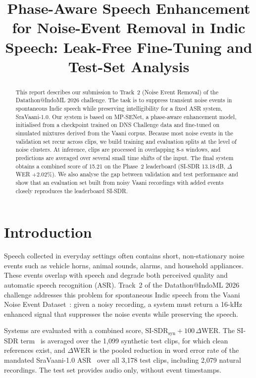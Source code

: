 \documentclass[conference]{IEEEtran}
\begin{document}
\title{Phase-Aware Speech Enhancement for Noise-Event Removal in Indic Speech: Leak-Free Fine-Tuning and Test-Set Analysis}
\author{
}
\maketitle

\begin{abstract}
This report describes our submission to Track~2 (Noise Event Removal) of the Datathon@IndoML 2026 challenge. The task is to suppress transient noise events in spontaneous Indic speech while preserving intelligibility for a fixed ASR system, SraVaani-1.0. Our system is based on MP-SENet, a phase-aware enhancement model, initialised from a checkpoint trained on DNS Challenge data and fine-tuned on simulated mixtures derived from the Vaani corpus. Because most noise events in the validation set recur across clips, we build training and evaluation splits at the level of noise clusters. At inference, clips are processed in overlapping 8-s windows, and predictions are averaged over several small time shifts of the input. The final system obtains a combined score of 15.21 on the Phase~2 leaderboard (SI-SDR 13.18\,dB, $\Delta$WER $+2.02$\%). We also analyse the gap between validation and test performance and show that an evaluation set built from noisy Vaani recordings with added events closely reproduces the leaderboard SI-SDR.
\end{abstract}

\section{Introduction}
Speech collected in everyday settings often contains short, non-stationary noise events such as vehicle horns, animal sounds, alarms, and household appliances. These events overlap with speech and degrade both perceived quality and automatic speech recognition (ASR). Track~2 of the Datathon@IndoML 2026 challenge addresses this problem for spontaneous Indic speech from the Vaani Noise Event Dataset~\cite{basu2026vaani}: given a noisy recording, a system must return a 16-kHz enhanced signal that suppresses the noise events while preserving the speech.

Systems are evaluated with a combined score, $\text{SI-SDR}_\text{syn} + 100\,\Delta\text{WER}$. The SI-SDR term~\cite{le2019sdr} is averaged over the 1{,}099 synthetic test clips, for which clean references exist, and $\Delta$WER is the pooled reduction in word error rate of the mandated SraVaani-1.0 ASR~\cite{pulikodan2026sravaani} over all 3{,}178 test clips, including 2{,}079 natural recordings. The test set provides audio only, without event timestamps.
\end{document}

